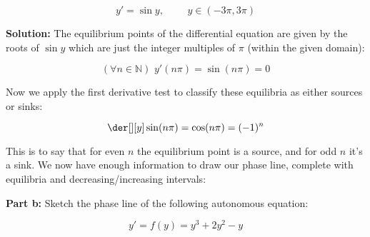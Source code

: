 \documentclass{article}
\begin{document}
\begin{equation*}
    y'=\sin y,\,\,\,\,\,\,\,\,\,\,\,\,\,\, y\in(-3\pi,3\pi)
\end{equation*}

\noindent\textbf{Solution:} The equilibrium points of the differential equation are given by the roots of $\sin y$ which are just the integer multiples of $\pi$ (within the given domain):

\begin{equation*}
    (\forall n\in\mathbb N)\,\,y'(n\pi)=\sin(n\pi)=0
\end{equation*}

Now we apply the first derivative test to classify these equilibria as either sources or sinks:

\begin{equation*}
    \der[][y]\sin (n\pi)=\cos(n\pi)=(-1)^{n}
\end{equation*}

This is to say that for even $n$ the equilibrium point is a source, and for odd $n$ it's a sink. We now have enough information to draw our phase line, complete with equilibria and decreasing/increasing intervals:

\begin{center}
\end{center}


\noindent\textbf{Part b:} Sketch the phase line of the following autonomous equation:

\begin{equation*}
    y'=f(y)=y^3+2y^2-y
\end{equation*}
\end{document}
